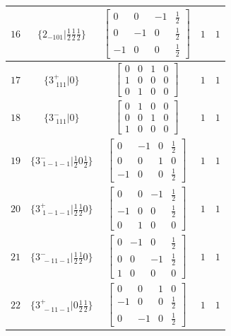 \documentclass[fleqn,8pt]{jsarticle}
\begin{document}
\begin{longtable}{ccccc}
$ 16 $ & $ \{2{}_{-101}|\frac{1}{2} \frac{1}{2} \frac{1}{2}\} $ & $ \begin{bmatrix} 0 & 0 & -1 & \frac{1}{2} \\ 0 & -1 & 0 & \frac{1}{2} \\ -1 & 0 & 0 & \frac{1}{2} \end{bmatrix} $ & $ 1 $ & $ 1 $ \\ \hline
$ 17 $ & $ \{3^{+}_{\,\,111}|0\} $ & $ \begin{bmatrix} 0 & 0 & 1 & 0 \\ 1 & 0 & 0 & 0 \\ 0 & 1 & 0 & 0 \end{bmatrix} $ & $ 1 $ & $ 1 $ \\ \hline
$ 18 $ & $ \{3^{-}_{\,\,111}|0\} $ & $ \begin{bmatrix} 0 & 1 & 0 & 0 \\ 0 & 0 & 1 & 0 \\ 1 & 0 & 0 & 0 \end{bmatrix} $ & $ 1 $ & $ 1 $ \\ \hline
$ 19 $ & $ \{3^{-}_{\,\,1-1-1}|\frac{1}{2} 0 \frac{1}{2}\} $ & $ \begin{bmatrix} 0 & -1 & 0 & \frac{1}{2} \\ 0 & 0 & 1 & 0 \\ -1 & 0 & 0 & \frac{1}{2} \end{bmatrix} $ & $ 1 $ & $ 1 $ \\ \hline
$ 20 $ & $ \{3^{+}_{\,\,1-1-1}|\frac{1}{2} \frac{1}{2} 0\} $ & $ \begin{bmatrix} 0 & 0 & -1 & \frac{1}{2} \\ -1 & 0 & 0 & \frac{1}{2} \\ 0 & 1 & 0 & 0 \end{bmatrix} $ & $ 1 $ & $ 1 $ \\ \hline
$ 21 $ & $ \{3^{-}_{\,\,-11-1}|\frac{1}{2} \frac{1}{2} 0\} $ & $ \begin{bmatrix} 0 & -1 & 0 & \frac{1}{2} \\ 0 & 0 & -1 & \frac{1}{2} \\ 1 & 0 & 0 & 0 \end{bmatrix} $ & $ 1 $ & $ 1 $ \\ \hline
$ 22 $ & $ \{3^{+}_{\,\,-11-1}|0 \frac{1}{2} \frac{1}{2}\} $ & $ \begin{bmatrix} 0 & 0 & 1 & 0 \\ -1 & 0 & 0 & \frac{1}{2} \\ 0 & -1 & 0 & \frac{1}{2} \end{bmatrix} $ & $ 1 $ & $ 1 $ \\ \hline

\end{longtable}
\end{document}
